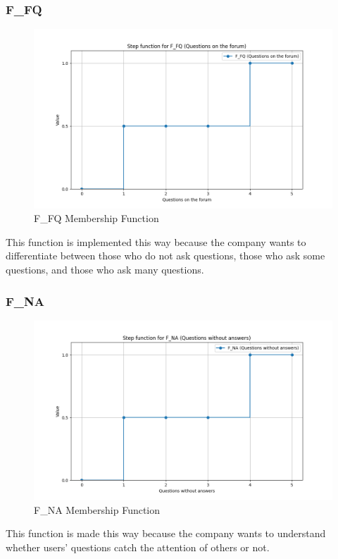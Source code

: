 \subsubsection{F\_FQ}
\begin{figure}[H]
    \centering
    \includegraphics[width=\textwidth]{./assets/plot_F_FQ.png}
    \caption{F\_FQ Membership Function}
    \label{fig:plot_F_FQ}
\end{figure}
This function is implemented this way because the company wants to differentiate between those who do not ask questions, those who ask some questions, and those who ask many questions.
\subsubsection{F\_NA}
\begin{figure}[H]
    \centering
    \includegraphics[width=\textwidth]{./assets/plot_F_NA.png}
    \caption{F\_NA Membership Function}
    \label{fig:plot_F_NA}
\end{figure}
This function is made this way because the company wants to understand whether users' questions catch the attention of others or not.
